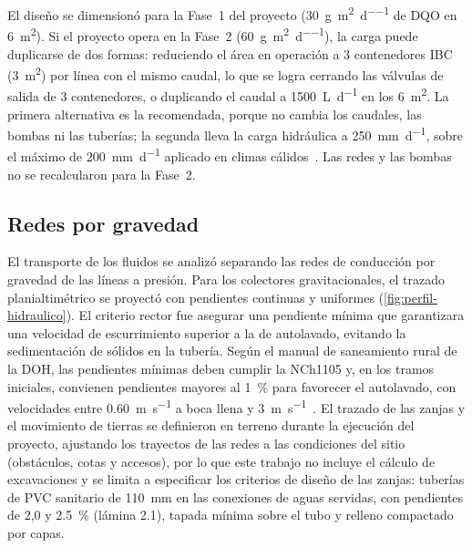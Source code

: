 El diseño se dimensionó para la Fase~1 del proyecto (\qty{30}{\gram\per\square\meter\per\day} de DQO en \qty{6}{\square\meter}).
Si el proyecto opera en la Fase~2 (\qty{60}{\gram\per\square\meter\per\day}), la carga puede duplicarse de dos formas: reduciendo el área en operación a 3 contenedores IBC (\qty{3}{\square\meter}) por línea con el mismo caudal, lo que se logra cerrando las válvulas de salida de 3 contenedores, o duplicando el caudal a \qty{1500}{\liter\per\day} en los \qty{6}{\square\meter}.
La primera alternativa es la recomendada, porque no cambia los caudales, las bombas ni las tuberías; la segunda lleva la carga hidráulica a \qty{250}{\milli\meter\per\day}, sobre el máximo de \qty{200}{\milli\meter\per\day} aplicado en climas cálidos~\parencite{dotro2021humedales}.
Las redes y las bombas no se recalcularon para la Fase~2.

\subsection{Redes por gravedad}

El transporte de los fluidos se analizó separando las redes de conducción por gravedad de las líneas a presión.
Para los colectores gravitacionales, el trazado planialtimétrico se proyectó con pendientes continuas y uniformes (\cref{fig:perfil-hidraulico}).
El criterio rector fue asegurar una pendiente mínima que garantizara una velocidad de escurrimiento superior a la de autolavado, evitando la sedimentación de sólidos en la tubería.
Según el manual de saneamiento rural de la DOH, las pendientes mínimas deben cumplir la NCh1105 y, en los tramos iniciales, convienen pendientes mayores al \qty{1}{\percent} para favorecer el autolavado, con velocidades entre \qty{0.60}{\meter\per\second} a boca llena y \qty{3}{\meter\per\second}~\parencite{doh2023manual}.
El trazado de las zanjas y el movimiento de tierras se definieron en terreno durante la ejecución del proyecto, ajustando los trayectos de las redes a las condiciones del sitio (obstáculos, cotas y accesos), por lo que este trabajo no incluye el cálculo de excavaciones y se limita a especificar los criterios de diseño de las zanjas: tuberías de PVC sanitario de \qty{110}{\milli\meter} en las conexiones de aguas servidas, con pendientes de 2,0 y \qty{2.5}{\percent} (lámina 2.1), tapada mínima sobre el tubo y relleno compactado por capas.

